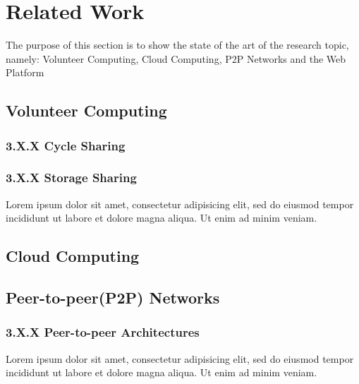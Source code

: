 % 
% 


\section{Related Work}
The purpose of this section is to show the state of the art of the research topic, namely: Volunteer Computing, Cloud Computing, P2P Networks and the Web Platform



\subsection{Volunteer Computing}


\subsubsection{3.X.X Cycle Sharing}

\subsubsection{3.X.X Storage Sharing}
Lorem ipsum dolor sit amet, consectetur adipisicing elit, sed do eiusmod
tempor incididunt ut labore et dolore magna aliqua. Ut enim ad minim veniam.


\subsection{Cloud Computing}



\subsection{Peer-to-peer(P2P) Networks}


\subsubsection{3.X.X Peer-to-peer Architectures}
Lorem ipsum dolor sit amet, consectetur adipisicing elit, sed do eiusmod
tempor incididunt ut labore et dolore magna aliqua. Ut enim ad minim veniam.


